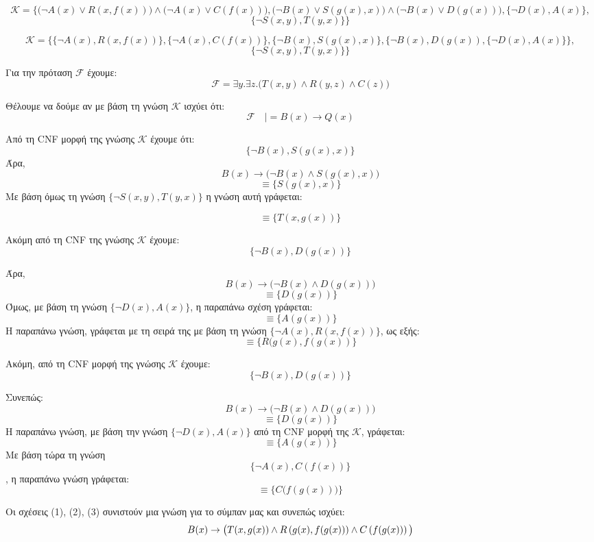 \documentclass[a4paper,oneside, 11pt]{article}
\newcommand*{\im}{\ensuremath{\to}}
\newcommand*{\ex}{\ensuremath{\exists}}
\newcommand*{\p}{\ensuremath{\left(}}
\newcommand*{\pp}{\ensuremath{\right)}}
\newcommand*{\ww}{\ensuremath{\wedge}}
\newcommand*{\vv}{\ensuremath{\vee}}
\newcommand*{\eq}{\ensuremath{\equiv}}
\begin{document}
$$
\mathcal{K} = \{ \big( \neg A(x) \vv R(x, f(x)) \big) \ww \big(  \neg A(x) \vv C(f(x)) \big), \big( \neg B(x) \vv S(g(x), x) \big) \ww \big( \neg B(x) \vv D(g(x)) \big), \{ \neg D(x), A(x) \},
$$
$$
\{ \neg S(x,y), T(y,x) \}
\}
$$
\pagebreak 

$$
\mathcal{K} = \{ \{ \neg A(x), R(x, f(x))\},\{\neg A(x), C(f(x)) \}, \{ \neg B(x), S(g(x), x)\}, \{ \neg B(x), D(g(x)), \{ \neg D(x), A(x) \}\}, 
$$
$$
\{ \neg S(x,y), T(y,x) \}
\}
$$

Για την πρόταση $\mathcal F$ έχουμε:
$$
\mathcal{F} = \ex y. \ex z. \big( T(x,y) \ww R(y,z) \ww C(z) \big)
$$

Θέλουμε να δούμε αν με βάση τη γνώση $\mathcal{K}$ ισχύει ότι:
$$\mathcal{F} \quad |= B(x) \im Q(x)$$

Από τη CNF μορφή της γνώσης $\mathcal K$ έχουμε ότι:
$$\{ \neg B(x), S(g(x), x) \}$$
Άρα,
$$B(x) \im \big( \neg B(x) \ww S(g(x), x) \big)$$
$$\equiv \{ S(g(x), x) \}$$
Με βάση όμως τη γνώση $\{ \neg S(x,y), T(y,x) \}$ η γνώση αυτή γράφεται:

\begin{equation}
\eq \{ T(x, g(x)) \}
\end{equation} 

\bigbreak 

Ακόμη από τη CNF της γνώσης $\mathcal K$ έχουμε:
$$\{ \neg B(x), D(g(x))\}$$

Άρα,
$$B(x) \im \big( \neg B(x) \ww D(g(x)) \big)$$
$$\eq \{ D(g(x))\}$$
Όμως, με βάση τη γνώση $\{ \neg D(x), A(x) \}$, η παραπάνω σχέση γράφεται:
$$\eq \{ A(g(x)) \}$$
Η παραπάνω γνώση, γράφεται με τη σειρά της με βάση τη γνώση $\{ \neg A(x), R(x, f(x))\}$, ως εξής:
\begin{equation} 
\eq \{ R(g(x), f(g(x)) \} 
\end{equation}


\bigbreak


Ακόμη, από τη CNF μορφή της γνώσης $\mathcal{K}$ έχουμε:
$$\{ \neg B(x), D(g(x))\}$$

Συνεπώς:
$$B(x) \im \big( \neg B(x) \ww D(g(x))\big)$$
$$\equiv \{ D(g(x))\}$$
Η παραπάνω γνώση, με βάση την γνώση $\{ \neg D(x), A(x) \}$ από τη CNF μορφή της $\mathcal K$, γράφεται:
$$\eq \{ A(g(x))\} $$
Με βάση τώρα τη γνώση $$\{ \neg A(x), C(f(x)) \}$$, η παραπάνω γνώση γράφεται:
\begin{equation}
\eq \{C\big( f(g(x))\big)\}
\end{equation}


\bigbreak 

Οι σχέσεις (1), (2), (3) συνιστούν μια γνώση για το σύμπαν μας και συνεπώς ισχύει:
$$B(x) \im \big( T(x,g(x)) \ww R\p g(x), f(g(x))\pp \ww C\p f(g(x))\pp \big)$$
\end{document}
